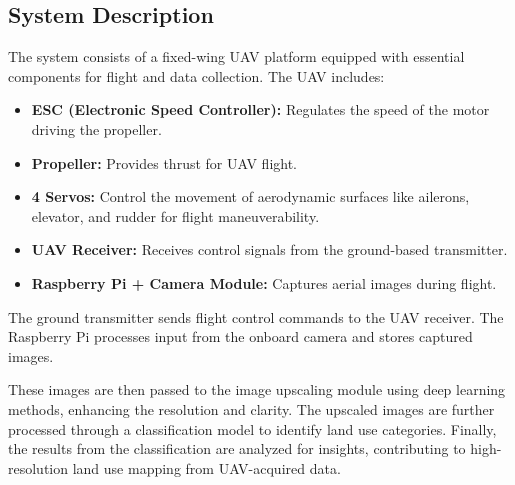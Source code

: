 \subsection{System Description}

The system consists of a fixed-wing UAV platform equipped with essential components for flight and data collection. The UAV includes:

\begin{itemize}
    \item \textbf{ESC (Electronic Speed Controller):} Regulates the speed of the motor driving the propeller.
    \item \textbf{Propeller:} Provides thrust for UAV flight.
    \item \textbf{4 Servos:} Control the movement of aerodynamic surfaces like ailerons, elevator, and rudder for flight maneuverability.
    \item \textbf{UAV Receiver:} Receives control signals from the ground-based transmitter.
    \item \textbf{Raspberry Pi + Camera Module:} Captures aerial images during flight.
\end{itemize}

The ground transmitter sends flight control commands to the UAV receiver. The Raspberry Pi processes input from the onboard camera and stores captured images.

These images are then passed to the image upscaling module using deep learning methods, enhancing the resolution and clarity. The upscaled images are further processed through a classification model to identify land use categories.
Finally, the results from the classification are analyzed for insights, contributing to high-resolution land use mapping from UAV-acquired data.

